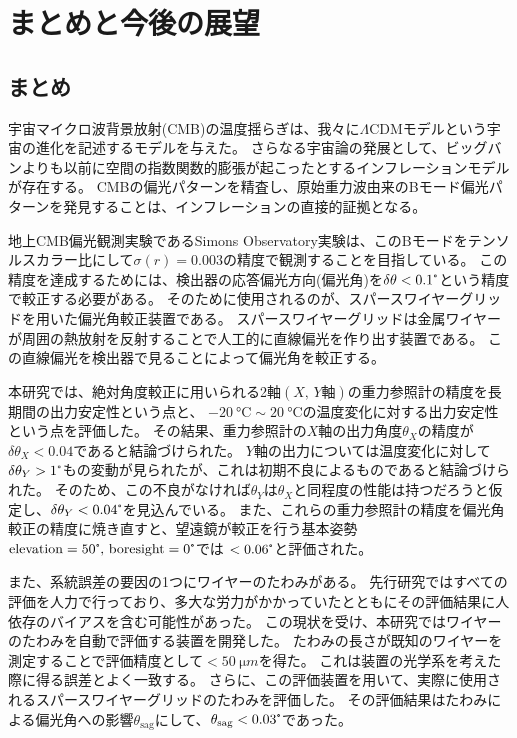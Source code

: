 \documentclass[../../main.tex]{subfiles}
\begin{document}
\chapter{まとめと今後の展望}
\section{まとめ}
宇宙マイクロ波背景放射(CMB)の温度揺らぎは、我々に$\Lambda \mathrm{CDM}$モデルという宇宙の進化を記述するモデルを与えた。
さらなる宇宙論の発展として、ビッグバンよりも以前に空間の指数関数的膨張が起こったとするインフレーションモデルが存在する。
CMBの偏光パターンを精査し、原始重力波由来のBモード偏光パターンを発見することは、インフレーションの直接的証拠となる。

地上CMB偏光観測実験であるSimons Observatory実験は、このBモードをテンソルスカラー比にして$\sigma(r)=0.003$の精度で観測することを目指している。
この精度を達成するためには、検出器の応答偏光方向(偏光角)を$\delta\theta<0.1\tcdegree$という精度で較正する必要がある。
そのために使用されるのが、スパースワイヤーグリッドを用いた偏光角較正装置である。
スパースワイヤーグリッドは金属ワイヤーが周囲の熱放射を反射することで人工的に直線偏光を作り出す装置である。
この直線偏光を検出器で見ることによって偏光角を較正する。

本研究では、絶対角度較正に用いられる2軸$(X,\,Y\text{軸})$の重力参照計の精度を長期間の出力安定性という点と、
$\SI{-20}{\degreeCelsius}\sim\SI{20}{\degreeCelsius}$の温度変化に対する出力安定性という点を評価した。
その結果、重力参照計の$X$軸の出力角度$\theta_{X}$の精度が$\delta\theta_{X}<0.04$であると結論づけられた。
$Y$軸の出力については温度変化に対して$\delta\theta_{Y}>1\tcdegree$もの変動が見られたが、これは初期不良によるものであると結論づけられた。
そのため、この不良がなければ$\theta_{Y}$は$\theta_{X}$と同程度の性能は持つだろうと仮定し、$\delta\theta_{Y}<0.04\tcdegree$を見込んでいる。
また、これらの重力参照計の精度を偏光角較正の精度に焼き直すと、望遠鏡が較正を行う基本姿勢$\mathrm{elevation}=50\tcdegree,\,\mathrm{boresight}=0\tcdegree$では
$<0.06\tcdegree$と評価された。

また、系統誤差の要因の1つにワイヤーのたわみがある。
先行研究ではすべての評価を人力で行っており、多大な労力がかかっていたとともにその評価結果に人依存のバイアスを含む可能性があった。
この現状を受け、本研究ではワイヤーのたわみを自動で評価する装置を開発した。
たわみの長さが既知のワイヤーを測定することで評価精度として$<\SI{50}{\micro m}$を得た。
これは装置の光学系を考えた際に得る誤差とよく一致する。
さらに、この評価装置を用いて、実際に使用されるスパースワイヤーグリッドのたわみを評価した。
その評価結果はたわみによる偏光角への影響$\theta_{\mathrm{sag}}$にして、$\theta_{\mathrm{sag}}<0.03\tcdegree$であった。
\end{document}
